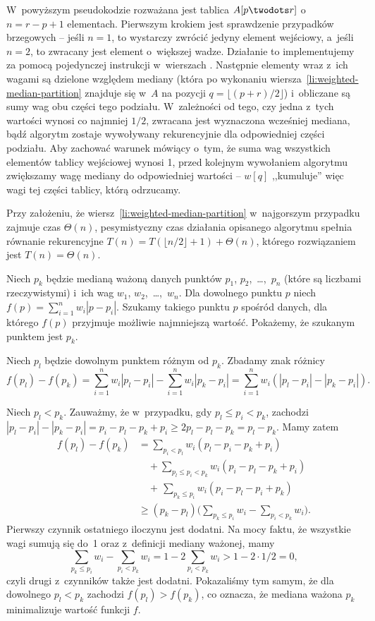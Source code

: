 W~powyższym pseudokodzie rozważana jest tablica $A[p\twodots r]$ o~$n=r-p+1$ elementach. Pierwszym krokiem jest sprawdzenie przypadków brzegowych -- jeśli $n=1$, to wystarczy zwrócić jedyny element wejściowy, a~jeśli $n=2$, to zwracany jest element o~większej wadze. Działanie to implementujemy za pomocą pojedynczej instrukcji  w~wierszach \doubledash{\ref{li:weighted-median-boundary-case-begin}}{\ref{li:weighted-median-boundary-case-end}}. Następnie elementy wraz z~ich wagami są dzielone względem mediany (która po wykonaniu wiersza~\ref{li:weighted-median-partition} znajduje się w~$A$ na pozycji $q=\lfloor(p+r)/2\rfloor$) i~obliczane są sumy wag obu części tego podziału. W~zależności od tego, czy jedna z~tych wartości wynosi co najmniej $1/2$, zwracana jest wyznaczona wcześniej mediana, bądź algorytm zostaje wywoływany rekurencyjnie dla odpowiedniej części podziału. Aby zachować warunek mówiący o~tym, że suma wag wszystkich elementów tablicy wejściowej wynosi 1, przed kolejnym wywołaniem algorytmu zwiększamy wagę mediany do odpowiedniej wartości -- $w[q]$ ,,kumuluje'' więc wagi tej części tablicy, którą odrzucamy.

Przy założeniu, że wiersz~\ref{li:weighted-median-partition} w~najgorszym przypadku zajmuje czas $\Theta(n)$, pesymistyczny czas działania opisanego algorytmu spełnia równanie rekurencyjne $T(n)=T(\lfloor n/2\rfloor+1)+\Theta(n)$, którego rozwiązaniem jest $T(n)=\Theta(n)$.

\subproblem %
Niech $p_k$ będzie medianą ważoną danych punktów $p_1$, $p_2$,~\dots,~$p_n$ (które są liczbami rzeczywistymi) i~ich wag $w_1$, $w_2$,~\dots,~$w_n$. Dla dowolnego punktu $p$ niech $f(p)=\sum_{i=1}^nw_i|p-p_i|$. Szukamy takiego punktu $p$ spośród danych, dla którego $f(p)$ przyjmuje możliwie najmniejszą wartość. Pokażemy, że szukanym punktem jest $p_k$.

Niech $p_l$ będzie dowolnym punktem różnym od $p_k$. Zbadamy znak różnicy
\[
    f(p_l)-f(p_k) = \sum_{i=1}^nw_i|p_l-p_i|-\sum_{i=1}^nw_i|p_k-p_i| = \sum_{i=1}^nw_i(|p_l-p_i|-|p_k-p_i|).
\]

Niech $p_l<p_k$. Zauważmy, że w~przypadku, gdy $p_l\le p_i<p_k$, zachodzi $|p_l-p_i|-|p_k-p_i|=p_i-p_l-p_k+p_i\ge2p_l-p_l-p_k=p_l-p_k$. Mamy zatem
\begin{align*}
    f(p_l)-f(p_k) &= \sum_{p_i<p_l}w_i(p_l-p_i-p_k+p_i) \\
	&\quad {}+\!\!\!\sum_{p_l\le p_i<p_k}\!\!\!\!w_i(p_i-p_l-p_k+p_i) \\
	&\quad {}+\,\sum_{p_k\le p_i}w_i(p_i-p_l-p_i+p_k) \\
	&\ge (p_k-p_l)\biggl(\sum_{p_k\le p_i}w_i-\sum_{p_i<p_k}w_i\biggr).
\end{align*}
Pierwszy czynnik ostatniego iloczynu jest dodatni. Na mocy faktu, że wszystkie wagi sumują się do~1 oraz z~definicji mediany ważonej, mamy
\[
    \sum_{p_k\le p_i}w_i-\sum_{p_i<p_k}w_i = 1-2\sum_{p_i<p_k}w_i > 1-2\cdot1/2 = 0,
\]
czyli drugi z~czynników także jest dodatni. Pokazaliśmy tym samym, że dla dowolnego $p_l<p_k$ zachodzi $f(p_l)>f(p_k)$, co oznacza, że mediana ważona $p_k$ minimalizuje wartość funkcji $f$.

